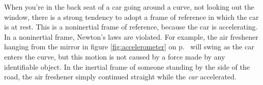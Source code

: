 When you're in the back seat of a car going around a curve,
not looking out the window,
there is a strong tendency to adopt a frame of reference in
which the car is at rest. This is a noninertial frame of reference,
because the car is accelerating. In a noninertial frame, Newton's
laws are violated. For example, the air freshener hanging from the mirror in figure
\ref{fig:accelerometer} on p.~\pageref{fig:accelerometer} will swing as the
car enters the curve, but this motion is not caused by a force made by any identifiable
object. In the
inertial frame of someone standing by the side of the road, the air freshener
simply continued straight while the \emph{car} accelerated.
